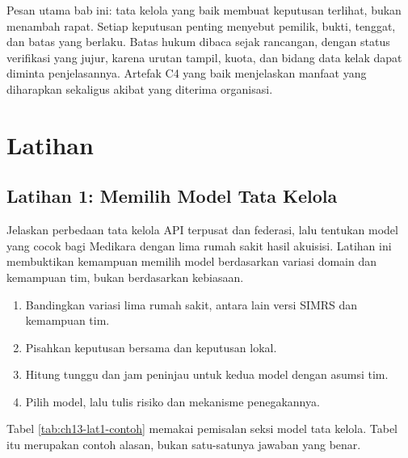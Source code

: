 Pesan utama bab ini: tata kelola yang baik membuat keputusan terlihat, bukan menambah rapat. Setiap keputusan penting menyebut pemilik, bukti, tenggat, dan batas yang berlaku. Batas hukum dibaca sejak rancangan, dengan status verifikasi yang jujur, karena urutan tampil, kuota, dan bidang data kelak dapat diminta penjelasannya. Artefak C4 yang baik menjelaskan manfaat yang diharapkan sekaligus akibat yang diterima organisasi.

\section{Latihan}

\subsection*{Latihan 1: Memilih Model Tata Kelola}

Jelaskan perbedaan tata kelola API terpusat dan federasi, lalu tentukan model yang cocok bagi Medikara dengan lima rumah sakit hasil akuisisi. Latihan ini membuktikan kemampuan memilih model berdasarkan variasi domain dan kemampuan tim, bukan berdasarkan kebiasaan.

\begin{enumerate}
  \item Bandingkan variasi lima rumah sakit, antara lain versi SIMRS dan kemampuan tim.
  \item Pisahkan keputusan bersama dan keputusan lokal.
  \item Hitung tunggu dan jam peninjau untuk kedua model dengan asumsi tim.
  \item Pilih model, lalu tulis risiko dan mekanisme penegakannya.
\end{enumerate}

Tabel \ref{tab:ch13-lat1-contoh} memakai pemisalan seksi model tata kelola. Tabel itu merupakan contoh alasan, bukan satu-satunya jawaban yang benar.

